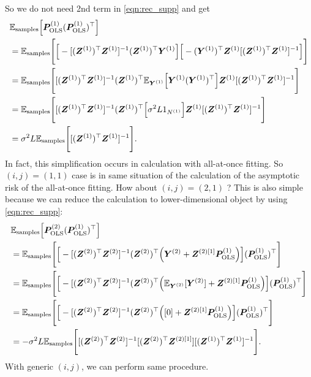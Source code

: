\documentclass{article}
\begin{document}
So we do not need 2nd term in \cref{eqn:rec_supp} and get
\begin{align}
&\mathbb{E}_\text{samples}
\Big[
\bm P_\mathrm{OLS}^{(1)}
(\bm P_\mathrm{OLS}^{(1)})^\top
\Big]
\notag \\
&=
\mathbb{E}_\text{samples}
\Bigg[
\Big[
-
[({\bm Z}^{(1)})^\top {\bm Z}^{(1)}]^{-1}
({\bm Z}^{(1)})^\top 
{\bm Y}^{(1)}
\Big]
\Big[
-
({\bm Y}^{(1)})^\top
{\bm Z}^{(1)}
[({\bm Z}^{(1)})^\top {\bm Z}^{(1)}]^{-1}
\Big]
\Bigg]
\notag \\
&=
\mathbb{E}_{\text{samples}}
\Bigg[
[({\bm Z}^{(1)})^\top {\bm Z}^{(1)}]^{-1}
({\bm Z}^{(1)})^\top 
\mathbb{E}_{\bm Y^{(1)}}
\Big[
{\bm Y}^{(1)}
({\bm Y}^{(1)})^\top
\Big]
{\bm Z}^{(1)}
[({\bm Z}^{(1)})^\top {\bm Z}^{(1)}]^{-1}
\Bigg]
\notag \\
&=
\mathbb{E}_{\text{samples}}
\Bigg[
[({\bm Z}^{(1)})^\top {\bm Z}^{(1)}]^{-1}
({\bm Z}^{(1)})^\top 
\Big[
\sigma^2 L 1_{N^{(1)}}
\Big]
{\bm Z}^{(1)}
[({\bm Z}^{(1)})^\top {\bm Z}^{(1)}]^{-1}
\Bigg]
\notag \\
&=
\sigma^2 L
\mathbb{E}_{\text{samples}}
\Bigg[
[({\bm Z}^{(1)})^\top {\bm Z}^{(1)}]^{-1}
\Bigg].
\label{eqn:P1P1}
\end{align}
In fact, this simplification occurs in calculation with all-at-once fitting.
So $(i, j) = (1,1)$ case is in same situation of the calculation of the asymptotic risk of the all-at-once fitting.
How about $(i, j) = (2, 1)$ ?
This is also simple because we can reduce the calculation to lower-dimensional object by using \cref{eqn:rec_supp}:
\begin{align}
&\mathbb{E}_\text{samples}
\Big[
\bm P_\mathrm{OLS}^{(2)}
(\bm P_\mathrm{OLS}^{(1)})^\top
\Big]
\notag \\
&=
\mathbb{E}_\text{samples}
\Bigg[
\Big[
-
[({\bm Z}^{(2)})^\top {\bm Z}^{(2)}]^{-1}
({\bm Z}^{(2)})^\top 
\Big(
{\bm Y}^{(2)}
+
\bm Z^{(2)[1]}
\bm P_\mathrm{OLS}^{(1)}
\Big)
\Big]
(\bm P_\mathrm{OLS}^{(1)})^\top
\Bigg]
\notag \\
&=
\mathbb{E}_\text{samples}
\Bigg[
\Big[
-
[({\bm Z}^{(2)})^\top {\bm Z}^{(2)}]^{-1}
({\bm Z}^{(2)})^\top 
\Big(
\mathbb{E}_{\bm Y^{(2)}}
[
{\bm Y}^{(2)}
]
+
\bm Z^{(2)[1]}
\bm P_\mathrm{OLS}^{(1)}
\Big)
\Big]
(\bm P_\mathrm{OLS}^{(1)})^\top
\Bigg]
\notag \\
&=
\mathbb{E}_\text{samples}
\Bigg[
\Big[
-
[({\bm Z}^{(2)})^\top {\bm Z}^{(2)}]^{-1}
({\bm Z}^{(2)})^\top 
\Big(
[
0
]
+
\bm Z^{(2)[1]}
\bm P_\mathrm{OLS}^{(1)}
\Big)
\Big]
(\bm P_\mathrm{OLS}^{(1)})^\top
\Bigg]
\notag \\
&=
- \sigma^2 L
\mathbb{E}_\text{samples}
\Bigg[
[({\bm Z}^{(2)})^\top {\bm Z}^{(2)}]^{-1}
[({\bm Z}^{(2)})^\top \bm Z^{(2)[1]}]
[({\bm Z}^{(1)})^\top {\bm Z}^{(1)}]^{-1}
\Bigg].
\label{eqn:P2P1}
\end{align}
With generic $(i, j)$, we can perform same procedure.
\end{document}
